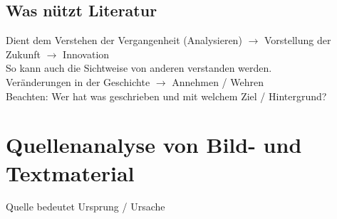 \documentclass[10pt, openright=true]{scrartcl}
\begin{document}
\subsection{Was nützt Literatur}
Dient dem Verstehen der Vergangenheit (Analysieren) $ \rightarrow $ Vorstellung der Zukunft $ \rightarrow $ Innovation\\
So kann auch die Sichtweise von anderen verstanden werden.\\
Veränderungen in der Geschichte $ \rightarrow $ Annehmen / Wehren\\
Beachten: Wer hat was geschrieben und mit welchem Ziel / Hintergrund?
\section{Quellenanalyse von Bild- und Textmaterial} \vspace{-.2cm}
Quelle bedeutet Ursprung / Ursache \vspace{-.25cm}
\end{document}
